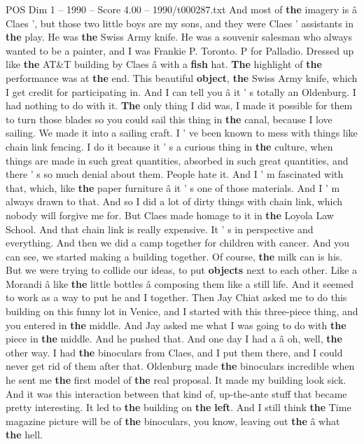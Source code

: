 \begin{textsample}{POS Dim 1 – 1990 – Score 4.00 – 1990/t000287.txt}
And most of \textbf{the} imagery is â Claes ', but those two little boys are my sons, and they were Claes ' assistants in \textbf{the} play.
He was \textbf{the} Swiss Army knife.
He was a souvenir salesman who always wanted to be a painter, and I was Frankie P.
Toronto.
P for Palladio.
Dressed up like \textbf{the} AT\&T building by Claes â with a \textbf{fish} hat. \textbf{The} highlight of \textbf{the} performance was at \textbf{the} end.
This beautiful \textbf{object}, \textbf{the} Swiss Army knife, which I get credit for participating in.
And I can tell you â it ' s totally an Oldenburg.
I had nothing to do with it. \textbf{The} only thing I did was, I made it possible for them to turn those blades so you could sail this thing in \textbf{the} canal, because I love sailing.
We made it into a sailing craft.
I ' ve been known to mess with things like chain link fencing.
I do it because it ' s a curious thing in \textbf{the} culture, when things are made in such great quantities, absorbed in such great quantities, and there ' s so much denial about them.
People hate it.
And I ' m fascinated with that, which, like \textbf{the} paper furniture â it ' s one of those materials.
And I ' m always drawn to that.
And so I did a lot of dirty things with chain link, which nobody will forgive me for.
But Claes made homage to it in \textbf{the} Loyola Law School.
And that chain link is really expensive.
It ' s in perspective and everything.
And then we did a camp together for children with cancer.
And you can see, we started making a building together.
Of course, \textbf{the} milk can is his.
But we were trying to collide our ideas, to put \textbf{objects} next to each other.
Like a Morandi â like \textbf{the} little bottles â composing them like a still life.
And it seemed to work as a way to put he and I together.
Then Jay Chiat asked me to do this building on this funny lot in Venice, and I started with this three-piece thing, and you entered in \textbf{the} middle.
And Jay asked me what I was going to do with \textbf{the} piece in \textbf{the} middle.
And he pushed that.
And one day I had a â oh, well, \textbf{the} other way.
I had \textbf{the} binoculars from Claes, and I put them there, and I could never get rid of them after that.
Oldenburg made \textbf{the} binoculars incredible when he sent me \textbf{the} first model of \textbf{the} real proposal.
It made my building look sick.
And it was this interaction between that kind of, up-the-ante stuff that became pretty interesting.
It led to \textbf{the} building on \textbf{the} \textbf{left}.
And I still think \textbf{the} Time magazine picture will be of \textbf{the} binoculars, you know, leaving out \textbf{the} â what \textbf{the} hell.

\end{textsample}

